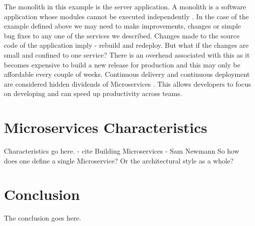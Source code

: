 \documentclass[journal]{IEEEtran}
\begin{document}
The monolith in this example is the server application. A monolith is a software application whose modules cannot be executed independently \cite{MicroservicesYesterdayTodayTomorrow}. In the case of the example defined above we may need to make improvements, changes or simple bug fixes to any one of the services we described. Changes made to the source code of the application imply - rebuild and redeploy. But what if the changes are small and confined to one service? There is an overhead associated with this as it becomes expensive to build a new release for production and this may only be affordable every couple of weeks. Continuous delivery and continuous deployment are considered hidden dividends of Microservices \cite{hiddendividends}. This allows developers to focus on developing and can speed up productivity across teams. 

\section{Microservices Characteristics}

Characteristics go here. - cite Building Microservices - Sam Newmann
So how does one define a single Microservice? Or the architectural style as a whole? 

\section{Conclusion}
The conclusion goes here.

\newpage
\printbibliography

\end{document}
